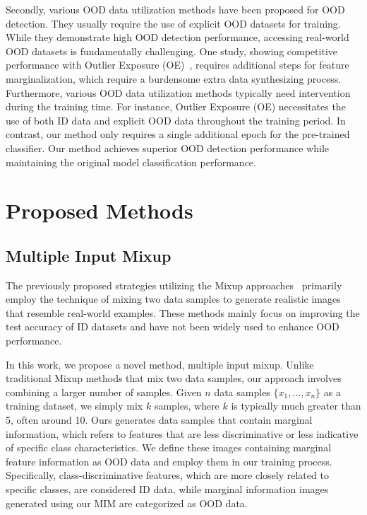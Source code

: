 \documentclass[letterpaper]{article} %
\begin{document}
Secondly, various OOD data utilization methods have been proposed for OOD detection.
They usually require the use of explicit OOD datasets for training.
While they demonstrate high OOD detection performance, accessing real-world OOD datasets is fundamentally challenging.
One study, showing competitive performance with Outlier Exposure (OE)~\cite{OE}, requires additional steps for feature marginalization, which require a burdensome extra data synthesizing process.
Furthermore, various OOD data utilization methods typically need intervention during the training time. 
For instance, Outlier Exposure (OE) necessitates the use of both ID data and explicit OOD data throughout the training period.
In contrast, our method only requires a single additional epoch for the pre-trained classifier.
Our method achieves superior OOD detection performance while maintaining the original model classification performance.


\section{Proposed Methods}
\vspace{-0.1cm}
\subsection{Multiple Input Mixup}

The previously proposed strategies utilizing the Mixup approaches~\cite{mixup, cutmix, manifoldmixup} primarily employ the technique of mixing two data samples to generate realistic images that resemble real-world examples. These methods mainly focus on improving the test accuracy of ID datasets and have not been widely used to enhance OOD performance.

In this work, we propose a novel method, multiple input mixup.
Unlike traditional Mixup methods that mix two data samples, our approach involves combining a larger number of samples.
Given $n$ data samples $\{x_1, \ldots, x_n\}$ as a training dataset, we simply mix $k$ samples, where $k$ is typically much greater than 5, often around 10.
Ours generates data samples that contain marginal information, which refers to features that are less discriminative or less indicative of specific class characteristics.
We define these images containing marginal feature information as OOD data and employ them in our training process.
Specifically, class-discriminative features, which are more closely related to specific classes, are considered ID data, while marginal information images generated using our MIM are categorized as OOD data. 
\end{document}
